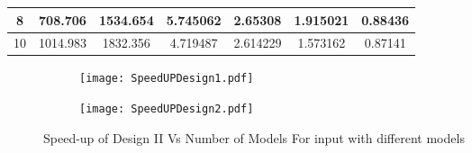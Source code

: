 \begin{table}[]
{\begin{tabular}{|c|c|c|c|l|c|c|}
8                                                                             & 708.706                                                                                                                                                                                                                        & 1534.654                                                                                                                                                                                                                     & 5.745062                                                                                                                        & 2.65308                                                                                                                                               & 1.915021                                                                                   & 0.88436                                                                                    \\ \hline
10                                                                            & 1014.983                                                                                                                                                                                                                       & 1832.356                                                                                                                                                                                                                     & 4.719487                                                                                                                        & 2.614229                                                                                                                                              & 1.573162                                                                                   & 0.87141                                                                                    \\ \hline
\end{tabular}}
\end{table}

\begin{figure}
\centering
\captionsetup[subfigure]{labelformat=empty}
\begin{subfigure}
\centering
\texttt{[image: SpeedUPDesign1.pdf]}
\label{fig:SpeedUPDesign1}
\end{subfigure}
\begin{subfigure}
\centering
\texttt{[image: SpeedUPDesign2.pdf]}
\label{fig:SpeedUPDesign2}
\end{subfigure}
\label{fig:SpeedUPForDesigns}
\caption{Speed-up of Design II Vs Number of Models For input with different models}
\end{figure}


